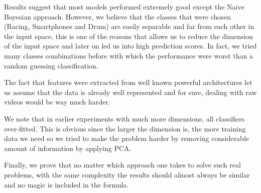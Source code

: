 \documentclass{article}
\begin{document}
Results suggest that most models performed extremely good except the Naive Bayesian approach. However, we believe that the classes that were chosen (Racing, Smartphones and Drum) are easily separable and far from each other in the input space, this is one of the reasons that allows us to reduce the dimension of the input space and later on led us into high prediction scores. In fact, we tried many classes combinations before with which the performance were worst than a random guessing classification.

The fact that features were extracted from well known powerful architectures let us assume that the data is already well represented and for sure, dealing with raw videos would be way much harder.

We note that in earlier experiments with much more dimensions, all classifiers over-fitted. This is obvious since the larger the dimension is, the more training data we need so we tried to make the problem harder by removing considerable amount of information by applying PCA.

Finally, we prove that no matter which approach one takes to solve such real problems, with the same complexity the results should almost always be similar and no magic is included in the formula.
 
 





\end{document}
